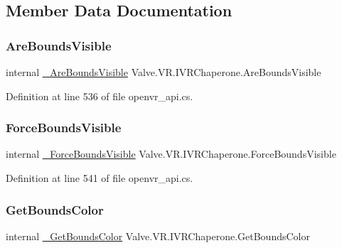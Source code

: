 \subsection{Member Data Documentation}
\mbox{\label{struct_valve_1_1_v_r_1_1_i_v_r_chaperone_a4761146053f0f72a80fe1c32454b35bc}} 
\subsubsection{\texorpdfstring{AreBoundsVisible}{AreBoundsVisible}}
{\footnotesize\ttfamily internal \mbox{\hyperlink{struct_valve_1_1_v_r_1_1_i_v_r_chaperone_a289d2c423a5d733af2043862b4540305}{\+\_\+\+Are\+Bounds\+Visible}} Valve.\+V\+R.\+I\+V\+R\+Chaperone.\+Are\+Bounds\+Visible}



Definition at line 536 of file openvr\+\_\+api.\+cs.

\mbox{\label{struct_valve_1_1_v_r_1_1_i_v_r_chaperone_ae2b54756ba7feacf2db57665b1d41f91}} 
\subsubsection{\texorpdfstring{ForceBoundsVisible}{ForceBoundsVisible}}
{\footnotesize\ttfamily internal \mbox{\hyperlink{struct_valve_1_1_v_r_1_1_i_v_r_chaperone_a39b5cfdb71537a5db356ab1783035fae}{\+\_\+\+Force\+Bounds\+Visible}} Valve.\+V\+R.\+I\+V\+R\+Chaperone.\+Force\+Bounds\+Visible}



Definition at line 541 of file openvr\+\_\+api.\+cs.

\mbox{\label{struct_valve_1_1_v_r_1_1_i_v_r_chaperone_a26b6cc95b407e96d954f102c189a89f7}} 
\subsubsection{\texorpdfstring{GetBoundsColor}{GetBoundsColor}}
{\footnotesize\ttfamily internal \mbox{\hyperlink{struct_valve_1_1_v_r_1_1_i_v_r_chaperone_a57187a62a05e7c3b6e31254db3608027}{\+\_\+\+Get\+Bounds\+Color}} Valve.\+V\+R.\+I\+V\+R\+Chaperone.\+Get\+Bounds\+Color}




